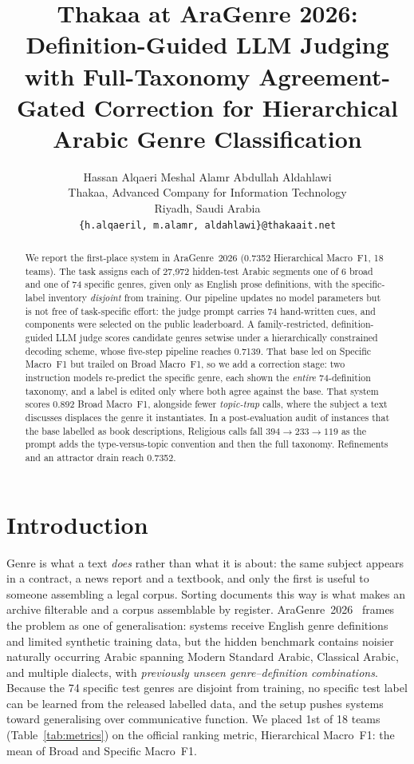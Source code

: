 \documentclass[11pt]{article}
\title{Thakaa at AraGenre 2026: Definition-Guided LLM Judging with Full-Taxonomy
Agreement-Gated Correction for Hierarchical Arabic Genre Classification}
\author{
  Hassan Alqaeri \quad Meshal Alamr \quad Abdullah Aldahlawi \\
  Thakaa, Advanced Company for Information Technology \\
  Riyadh, Saudi Arabia \\
  \texttt{\{h.alqaeril, m.alamr, aldahlawi\}@thakaait.net}
}
\begin{document}
\maketitle

\begin{abstract}
We report the first-place system in AraGenre~2026 (0.7352 Hierarchical Macro~F1, 18 teams). The
task assigns each of 27{,}972 hidden-test Arabic segments one of 6 broad and one of 74 specific
genres, given only as English prose definitions, with the specific-label inventory
\emph{disjoint} from training. Our pipeline updates no model parameters but is not free of
task-specific effort: the judge prompt carries 74 hand-written cues, and components were
selected on the public leaderboard. A family-restricted, definition-guided
LLM judge scores candidate genres setwise under a hierarchically constrained decoding scheme,
whose five-step pipeline reaches 0.7139. That base led on Specific Macro~F1 but trailed on Broad Macro~F1, so we add a
correction stage: two instruction models re-predict the specific genre, each shown the
\emph{entire} 74-definition taxonomy, and a label is edited only where both agree against the
base. That system scores 0.892 Broad Macro~F1, alongside fewer \emph{topic-trap} calls, where
the subject a text discusses displaces the genre it instantiates. In a post-evaluation audit of
instances that the base labelled as book descriptions, Religious calls fall
$394\rightarrow233\rightarrow119$ as the prompt adds the type-versus-topic convention and then
the full taxonomy.
Refinements and an attractor drain reach 0.7352.
\end{abstract}

\section{Introduction}
Genre is what a text \emph{does} rather than what it is about: the same subject appears in a
contract, a news report and a textbook, and only the first is useful to someone assembling a
legal corpus. Sorting documents this way is what makes an archive filterable and a corpus
assemblable by register.
AraGenre~2026~\citep{elhaj-etal-2026-aragenre} frames the problem as one of generalisation:
systems receive English genre definitions and limited synthetic training data, but the
hidden benchmark contains noisier naturally occurring Arabic spanning Modern Standard
Arabic, Classical Arabic, and multiple dialects, with \emph{previously unseen
genre--definition combinations}. Because the 74 specific test genres are disjoint from
training, no specific test label can be learned from the released labelled data, and the setup
pushes systems toward
generalising over communicative function. We placed 1st of 18 teams (Table~\ref{tab:metrics}) on the official ranking metric,
Hierarchical Macro~F1: the mean of Broad and Specific Macro~F1.
\end{document}
